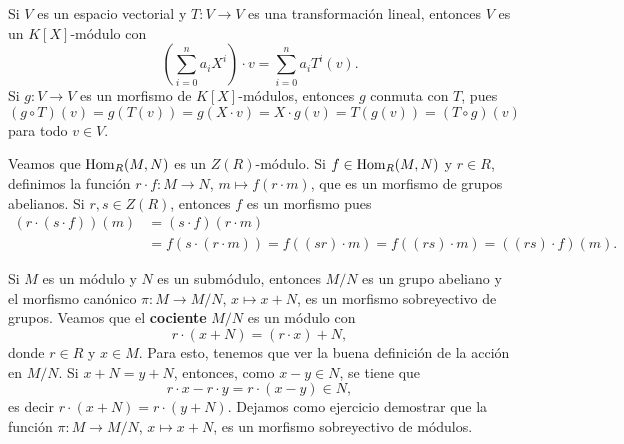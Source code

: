 \begin{example}
Si $V$ es un espacio vectorial y $T\colon V\to V$ es una transformación lineal, entonces
$V$ es un $K[X]$-módulo con 
\[
\left(\sum_{i=0}^n a_iX^i\right)\cdot v=\sum_{i=0}^n a_iT^i(v).
\]
Si $g\colon V\to V$ es un morfismo de $K[X]$-módulos, entonces $g$ conmuta con $T$, pues
\[
(g\circ T)(v)=g(T(v))=g(X\cdot v)=X\cdot g(v)=T(g(v))=(T\circ g)(v)
\]
para todo $v\in V$.
%
%
%
\end{example}


\begin{example}
\label{exa:Hom}
Veamos que $\operatorname{Hom}_R(M,N)$ es un $Z(R)$-módulo. Si $f\in\operatorname{Hom}_R(M,N)$ y $r\in R$, definimos la función 
$r\cdot f\colon M\to N$, $m\mapsto f(r\cdot m)$, que es un morfismo de grupos abelianos. 
Si $r,s\in Z(R)$, entonces $f$ es un morfismo pues
\begin{align*}
(r\cdot (s\cdot f))(m)&=
(s\cdot f)(r\cdot m)\\
&=f(s\cdot (r\cdot m))=f((sr)\cdot m)=f( (rs)\cdot m)=((rs)\cdot f)(m). 
\end{align*} 	
\end{example}

Si $M$ es un módulo y $N$ es un submódulo, entonces $M/N$ es un grupo abeliano y el morfismo
canónico $\pi\colon M\to M/N$, $x\mapsto x+N$, es un morfismo sobreyectivo de grupos. Veamos que 
el \textbf{cociente} $M/N$ es un módulo con 
\[
r\cdot (x+N)=(r\cdot x)+N,
\]
donde $r\in R$ y $x\in M$. Para esto, tenemos que ver la buena definición de la acción en $M/N$. Si $x+N=y+N$, entonces, como
$x-y\in N$, se tiene que 
\[
r\cdot x-r\cdot y=r\cdot (x-y)\in N,
\]
es decir $r\cdot (x+N)=r\cdot (y+N)$. Dejamos como ejercicio demostrar que la función $\pi\colon M\to M/N$, $x\mapsto x+N$, es
un morfismo sobreyectivo de módulos. 


